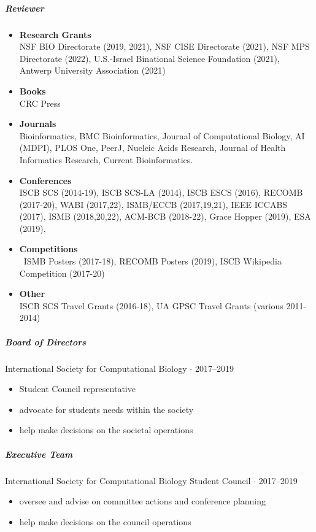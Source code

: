 \documentclass[10pt,letterpaper]{article}
\newcommand{\bigdot}{$\cdot$\xspace}
\begin{document}
\subparagraph{Reviewer} 
\begin{itemize}[leftmargin=!,labelindent=5pt,itemindent=-15pt]
    \item \textbf{Research Grants} \\ 
    	NSF BIO Directorate (2019, 2021), 
    	NSF CISE Directorate (2021), 
	NSF MPS Directorate (2022),
	U.S.-Israel Binational Science Foundation (2021), 
	Antwerp University Association (2021)
    \item \textbf{Books} \\
    	CRC Press
    \item \textbf{Journals} \\
        Bioinformatics,
        BMC Bioinformatics, 
        Journal of Computational Biology,
        AI (MDPI), 
        PLOS One, 
        PeerJ, 
        Nucleic Acids Research, 
        Journal of Health Informatics Research,
        Current Bioinformatics.
    \item \textbf{Conferences} \\
        ISCB SCS (2014-19), %
        ISCB SCS-LA (2014), %
        ISCB ESCS (2016), %
	RECOMB (2017-20), %
	WABI (2017,22), %
	ISMB/ECCB (2017,19,21), %
    	IEEE ICCABS (2017), %
	ISMB (2018,20,22), %
	ACM-BCB (2018-22), %
	Grace Hopper (2019), %
	ESA (2019). %
     \item \textbf{Competitions} \\\
     	ISMB Posters (2017-18),
	RECOMB Posters (2019), 
     	ISCB Wikipedia Competition (2017-20)
     \item \textbf{Other} \\
         ISCB SCS Travel Grants (2016-18), 
         UA GPSC Travel Grants (various 2011-2014)
\end{itemize}

\subparagraph{Board of Directors}
International Society for Computational Biology  \bigdot 2017--2019
\begin{itemize}
    \item Student Council representative 
    \item advocate for students needs within the society
    \item help make decisions on the societal operations
\end{itemize}

\subparagraph{Executive Team}
International Society for Computational Biology Student Council \bigdot 2017--2019
\begin{itemize} 
    \item oversee and advise on committee actions and conference planning 
    \item help make decisions on the council operations
\end{itemize}
\end{document}
